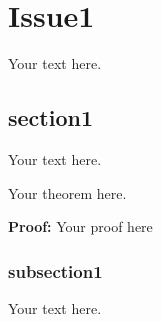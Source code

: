 \chapter{Issue1}
\label{chap:main-issue}

Your text here. \cite{demoref}

\section{section1}

Your text here. 
\begin{theorem}
Your theorem here.
\end{theorem}
\textbf{Proof:}
Your proof here
\QEDA

\subsection{subsection1}

Your text here.